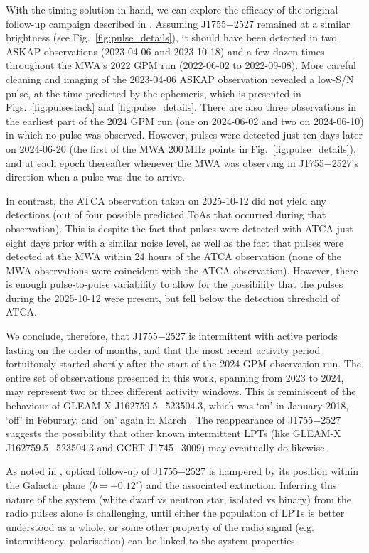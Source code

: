 \documentclass[fleqn,usenatbib]{mnras}
\newcommand{\src}{J1755$-$2527}
\newcommand{\Fig}{Fig.}
\newcommand{\Figs}{Figs.}
\begin{document}
With the timing solution in hand, we can explore the efficacy of the original follow-up campaign described in .
Assuming \src{} remained at a similar brightness (see \Fig~\ref{fig:pulse_details}), it should have been detected in two ASKAP observations (2023-04-06 and 2023-10-18) and a few dozen times throughout the MWA's 2022 GPM run (2022-06-02 to 2022-09-08).
More careful cleaning and imaging of the 2023-04-06 ASKAP observation revealed a low-S/N pulse, at the time predicted by the ephemeris, which is presented in \Figs~\ref{fig:pulsestack} and \ref{fig:pulse_details}.
There are also three observations in the earliest part of the 2024 GPM run (one on 2024-06-02 and two on 2024-06-10) in which no pulse was observed.
However, pulses were detected just ten days later on 2024-06-20 (the first of the MWA 200\,MHz points in \Fig~\ref{fig:pulse_details}), and at each epoch thereafter whenever the MWA was observing in \src{}'s direction when a pulse was due to arrive.

In contrast, the ATCA observation taken on 2025-10-12 did not yield any detections (out of four possible predicted ToAs that occurred during that observation).
This is despite the fact that pulses were detected with ATCA just eight days prior with a similar noise level, as well as the fact that pulses were detected at the MWA within 24 hours of the ATCA observation (none of the MWA observations were coincident with the ATCA observation).
However, there is enough pulse-to-pulse variability to allow for the possibility that the pulses during the 2025-10-12 were present, but fell below the detection threshold of ATCA.

We conclude, therefore, that \src{} is intermittent with active periods lasting on the order of months, and that the most recent activity period fortuitously started shortly after the start of the 2024 GPM observation run.
The entire set of observations presented in this work, spanning from 2023 to 2024, may represent two or three different activity windows.
This is reminiscent of the behaviour of GLEAM-X J162759.5$-$523504.3, which was `on' in January 2018, `off' in Feburary, and `on' again in March \citep{2022Natur.601..526H}.
The reappearance of \src{} suggests the possibility that other known intermittent LPTs (like GLEAM-X J162759.5$-$523504.3 and GCRT J1745$-$3009) may eventually do likewise.

As noted in , optical follow-up of \src{} is hampered by its position within the Galactic plane ($b = -0.12^\circ$) and the associated extinction.
Inferring this nature of the system (white dwarf vs neutron star, isolated vs binary) from the radio pulses alone is challenging, until either the population of LPTs is better understood as a whole, or some other property of the radio signal (e.g. intermittency, polarisation) can be linked to the system properties.
\end{document}
